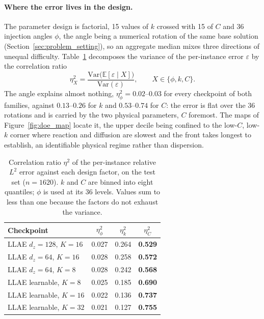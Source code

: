 ﻿\documentclass[a4paper,12pt]{article}
\theoremstyle{definition}
\theoremstyle{remark}
\begin{document}
\paragraph{Where the error lives in the design.}
The parameter design is factorial, 15 values of $k$ crossed with 15 of $C$ and 36 injection angles $\phi$, the angle being a numerical rotation of the same base solution (Section~\ref{sec:problem_setting}), so an aggregate median mixes three directions of unequal difficulty. Table~\ref{tab:eta2} decomposes the variance of the per-instance error $\varepsilon$ by the correlation ratio
\begin{equation}
\label{eq:eta2}
    \eta^2_X = \frac{\mathrm{Var}\bigl(\mathbb{E}[\varepsilon \mid X]\bigr)}{\mathrm{Var}(\varepsilon)},
    \qquad X \in \{\phi, k, C\}.
\end{equation}
The angle explains almost nothing, $\eta^2_\phi = 0.02$--$0.03$ for every checkpoint of both families, against $0.13$--$0.26$ for $k$ and $0.53$--$0.74$ for $C$: the error is flat over the 36 rotations and is carried by the two physical parameters, $C$ foremost. The maps of Figure~\ref{fig:doe_map} locate it, the upper decile being confined to the low-$C$, low-$k$ corner where reaction and diffusion are slowest and the front takes longest to establish, an identifiable physical regime rather than dispersion.

\begin{table}[htbp]
    \centering
    \small
    \renewcommand{\arraystretch}{1.3}
    \begin{tabular}{lccc}
        \toprule
        \textbf{Checkpoint} & $\eta^2_\phi$ & $\eta^2_k$ & $\eta^2_C$ \\
        \midrule
        LLAE $d_z=128$, $K=16$ & 0.027 & 0.264 & \textbf{0.529} \\
        LLAE $d_z=64$,  $K=16$ & 0.028 & 0.258 & \textbf{0.572} \\
        LLAE $d_z=64$,  $K=8$  & 0.028 & 0.242 & \textbf{0.568} \\
        \midrule
        LLAE learnable, $K=8$  & 0.025 & 0.185 & \textbf{0.690} \\
        LLAE learnable, $K=16$ & 0.022 & 0.136 & \textbf{0.737} \\
        LLAE learnable, $K=32$ & 0.021 & 0.127 & \textbf{0.755} \\
        \bottomrule
    \end{tabular}
    \caption{Correlation ratio $\eta^2$ of the per-instance relative $L^2$ error against each design factor, on the test set ($n=1620$). $k$ and $C$ are binned into eight quantiles; $\phi$ is used at its 36 levels. Values sum to less than one because the factors do not exhaust the variance.}
    \label{tab:eta2}
\end{table}
\end{document}

